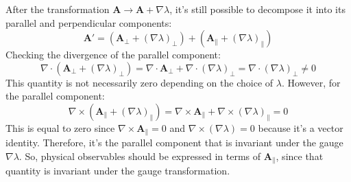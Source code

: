 \documentclass[10pt]{article}
\begin{document}
	\begin{solution}
		After the transformation \( \mathbf{A} \to \mathbf{A} + \nabla \lambda \), it's still possible to
		decompose it into its parallel and perpendicular components:
		\[
			\mathbf{A}' = (\mathbf{A}_{\perp} + (\nabla \lambda)_{\perp}) + (\mathbf{A}_{\parallel} + (\nabla
			\lambda)_{\parallel})
		\]
		Checking the divergence of the parallel component:
		\[
			\nabla \cdot (\mathbf{A}_{\perp} + (\nabla \lambda)_{\perp}) = \nabla \cdot \mathbf{A}_{\perp} +
			\nabla \cdot (\nabla \lambda)_{\perp} = \nabla \cdot (\nabla \lambda)_{\perp} \neq 0
		\]
		This quantity is not necessarily zero depending on the choice of \( \lambda \). However, for the
		parallel component:
		\[
			\nabla \times (\mathbf{A}_{\parallel} + (\nabla \lambda)_{\parallel}) = \nabla \times
			\mathbf{A}_{\parallel} + \nabla \times (\nabla \lambda) _{\parallel} = 0
		\]
		This is equal to zero since \( \nabla \times \mathbf{A}_{\parallel} = 0 \) and \( \nabla \times
		(\nabla \lambda) = 0 \) because it's a vector identity. Therefore, it's the parallel component that
		is invariant under the gauge \( \nabla \lambda \). So, physical observables should be expressed in
		terms of \( \mathbf{A}_{\parallel} \), since that quantity is invariant under the gauge
		transformation.  
	\end{solution}

	\pagebreak
\end{document}
